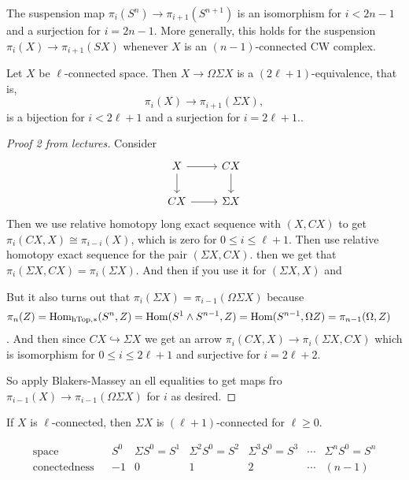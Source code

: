 \begin{lemma}
	The suspension map $\pi_{i}(S^{n})\to \pi_{i+1}(S^{n+1})$ is an isomorphism for $i<2n-1$ and a surjection for $i=2n-1$. More generally, this holds for the suspension $\pi_{i}(X)\to \pi_{i+1}(SX)$ whenever $X$ is an $(n-1)$-connected CW complex.
\end{lemma}
\begin{theorem}
		Let $X$ be $\ell$-connected space. Then $X\to\Omega\Sigma X$ is a $(2\ell+1)$-equivalence, that is,
	$$\pi_i(X)\to \pi_{i+1}(\Sigma X),$$
	is a bijection for $i<2\ell+1$ and a surjection for $i=2\ell+1$..
\end{theorem}
\begin{proof}[Proof 2 from lectures]
	Consider
	$$\begin{tikzcd}
		X\arrow[r]\arrow[d]&CX\arrow[d]\\
		CX\arrow[r]&\Sigma X
	\end{tikzcd}$$
	Then we use relative homotopy long exact sequence with $(X,CX)$ to get $\pi_i(CX,X)\cong\pi_{i-i}(X)$, which is zero for $0\leq i\leq \ell+1$. Then use relative homotopy exact sequence for the pair $(\Sigma X,CX)$. then we get that $\pi_i(\Sigma X,CX)=\pi_i(\Sigma X)$. And then if you use it for $(\Sigma X, X)$ and 
	
	But it also turns out that $\pi_i(\Sigma X)=\pi_{i-1}(\Omega\Sigma X)$ because
	\begin{align*}
		\pi_n(Z)&=\mathop{\mathrm{Hom}}\nolimits_{\text{hTop},*}(S^n,Z)=\mathop{\mathrm{Hom}}\nolimits(S^1\wedge S^{n-1},Z)=\text{Hom}(S^{n-1},\Omega Z)=\pi_{n-1}(\Omega,Z)
	\end{align*}.
	And then since $CX\hookrightarrow \Sigma X$ we get an arrow $\pi_i(CX,X)\to\pi_i(\Sigma X,CX)$ which is isomorphism for $0\leq i \leq 2\ell +1$ and surjective for $i=2\ell+2$.
	
	So apply Blakers-Massey an ell equalities to get maps fro $\pi_{i-1}(X)\to\pi_{i-1}(\Omega\Sigma X)$ for $i$ as desired.
\end{proof}
\begin{lemma}
	If $X$ is $\ell$-connected, then $\Sigma X$ is $(\ell+1)$-connected for $\ell\geq0$.
\end{lemma}
$$\begin{matrix}
	\text{space}&&S^0&\Sigma S^0=S^1&\Sigma^2S^0=S^2&\Sigma^3S^0=S^3&\cdots&\Sigma^nS^0=S^n\\
	\text{conectedness}&&-1&0&1&2&\cdots&(n-1)
\end{matrix}$$

